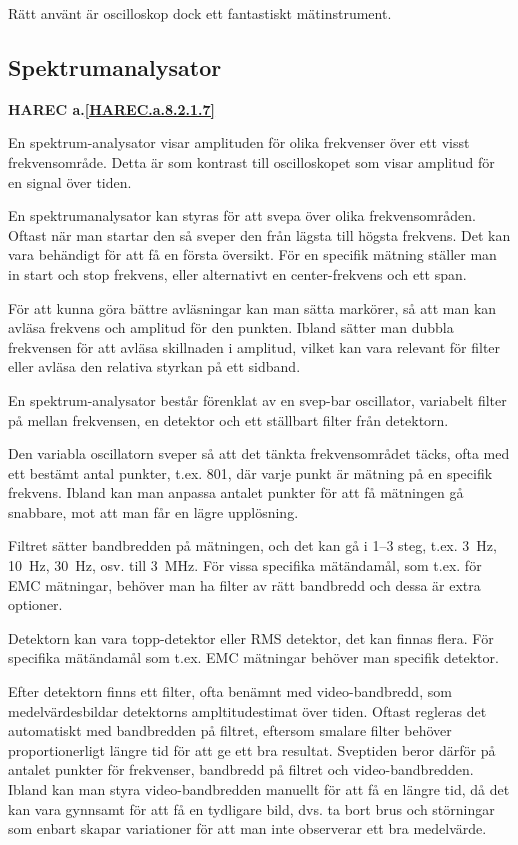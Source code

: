 Rätt använt är oscilloskop dock ett fantastiskt mätinstrument.

\subsection{Spektrumanalysator}
\textbf{
HAREC a.\ref{HAREC.a.8.2.1.7}\label{myHAREC.a.8.2.1.7}
}

En spektrum-analysator visar amplituden för olika frekvenser över ett visst
frekvensområde.
Detta är som kontrast till oscilloskopet som visar amplitud för en signal
över tiden.

En spektrumanalysator kan styras för att svepa över olika frekvensområden.
Oftast när man startar den så sveper den från lägsta till högsta frekvens.
Det kan vara behändigt för att få en första översikt.
För en specifik mätning ställer man in start och stop frekvens, eller
alternativt en center-frekvens och ett span.

För att kunna göra bättre avläsningar kan man sätta markörer, så att man kan
avläsa frekvens och amplitud för den punkten.
Ibland sätter man dubbla frekvensen för att avläsa skillnaden i amplitud,
vilket kan vara relevant för filter eller avläsa den relativa styrkan på ett
sidband.

En spektrum-analysator består förenklat av en svep-bar oscillator,
variabelt filter på mellan frekvensen, en detektor och ett ställbart
filter från detektorn.

Den variabla oscillatorn sveper så att det tänkta frekvensområdet täcks,
ofta med ett bestämt antal punkter, t.ex. 801, där varje punkt är mätning på
en specifik frekvens.
Ibland kan man anpassa antalet punkter för att få mätningen gå snabbare,
mot att man får en lägre upplösning.

Filtret sätter bandbredden på mätningen, och det kan gå i 1--3 steg, t.ex.
3~Hz, 10~Hz, 30~Hz, osv. till 3~MHz.
För vissa specifika mätändamål, som t.ex. för EMC mätningar, behöver man ha
filter av rätt bandbredd och dessa är extra optioner.

Detektorn kan vara topp-detektor eller RMS detektor, det kan finnas flera.
För specifika mätändamål som t.ex. EMC mätningar behöver man specifik detektor.

Efter detektorn finns ett filter, ofta benämnt med video-bandbredd, som
medelvärdesbildar detektorns ampltitudestimat över tiden.
Oftast regleras det automatiskt med bandbredden på filtret, eftersom smalare
filter behöver proportionerligt längre tid för att ge ett bra resultat.
Sveptiden beror därför på antalet punkter för frekvenser, bandbredd på filtret
och video-bandbredden.
Ibland kan man styra video-bandbredden manuellt för att få en längre tid, då
det kan vara gynnsamt för att få en tydligare bild, dvs. ta bort brus och
störningar som enbart skapar variationer för att man inte observerar ett bra
medelvärde.

